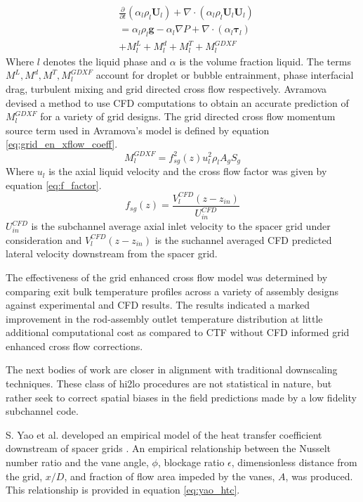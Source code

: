     	\begin{align}
    	& \frac{\partial }{\partial t}(\alpha_l \rho_l \mathbf U_l)
    	+ \nabla \cdot (\alpha_l \rho_l \mathbf U_l \mathbf U_l) \nonumber \\
    	&= \alpha_l \rho_l \mathbf{g} - \alpha_l \nabla P + 
    	\nabla \cdot (\alpha_l \bm{\tau}_l) \nonumber \\
    	&+ M^L_l + M^d_l + M^T_l + M_l^{GDXF}
        \label{eq:ctf_lat_mom}
    	\end{align}
Where $l$ denotes the liquid phase and $\alpha$ is the volume fraction liquid.  The terms $M^L, M^d, M^T, M_l^{GDXF}$ account for droplet or bubble entrainment, phase interfacial drag, turbulent mixing and grid directed cross flow respectively.  Avramova devised a method to use CFD computations to obtain an accurate prediction of $M_l^{GDXF}$ for a variety of grid designs.
The grid directed cross flow momentum source term used in Avramova's model is defined by equation \ref{eq:grid_en_xflow_coeff}.
    	\begin{equation}
    	M_l^{GDXF} = f^2_{sg}(z) u_l^2 \rho_l A_g S_g
        \label{eq:grid_en_xflow_coeff}
    	\end{equation}
        Where $u_l$ is the axial liquid velocity and the cross flow factor was given by equation \ref{eq:f_factor}.
    	\begin{equation}
    	f_{sg}(z) = \frac{V^{CFD}_l(z-z_{in})}{U^{CFD}_{in}}
        \label{eq:f_factor}
    	\end{equation}
        $U^{CFD}_{in}$ is the subchannel average axial inlet velocity to the spacer grid under consideration and $V^{CFD}_l(z-z_{in})$ is the suchannel averaged CFD predicted lateral velocity downstream from the spacer grid.

 The effectiveness of the grid enhanced cross flow model was determined by comparing exit bulk temperature profiles across a variety of assembly designs against experimental and CFD results.  The results indicated a marked improvement in the rod-assembly outlet temperature distribution at little additional computational cost as compared to CTF without CFD informed grid enhanced cross flow corrections.  
 
 The next bodies of work are closer in alignment with traditional downscaling techniques.  These class of hi2lo procedures are not statistical in nature, but rather seek to correct spatial biases in the field predictions made by a low fidelity subchannel code.

    
S. Yao et al. developed an empirical model of the heat transfer coefficient downstream of spacer grids \cite{yao82}.
    An empirical relationship between the Nusselt number ratio and the vane angle, $\phi$, blockage ratio $\epsilon$, dimensionless distance from the grid, $x/D$, and fraction of flow area impeded by the vanes, $A$, was produced.  This relationship is provided in equation \ref{eq:yao_htc}.
    
